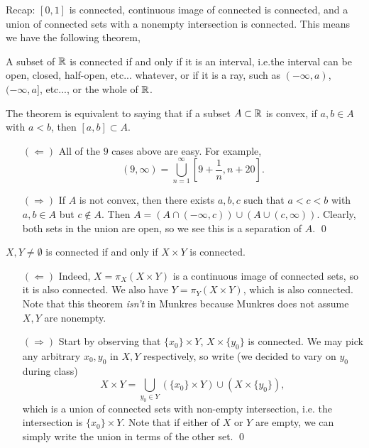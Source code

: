 \noindent Recap: $[0, 1]$ is connected, continuous image of connected is connected, and a union of connected sets with a nonempty intersection is connected. This means we have the following theorem,
\begin{simplethm}
    A subset of $\mathbb R$ is connected if and only if it is an interval, i.e.the interval can be open, closed, half-open, etc... whatever, or if it is a ray, such as $(-\infty, a)$, $(-\infty, a]$, etc..., or the whole of $\mathbb R$.
\end{simplethm}
\noindent The theorem is equivalent to saying that if a subset $A \subset \mathbb R$ is convex, if $a, b \in A$ with $a < b$, then $[a, b] \subset A$.
\begin{itemize}
    \item[$(\Leftarrow)$] All of the $9$ cases above are easy. For example,
    \[ (9, \infty) = \bigcup_{n=1}^\infty \left[9 + \frac{1}{n}, n + 20\right]. \]
    \item[$(\Rightarrow)$] If $A$ is not convex, then there exists $a, b, c$ such that $a < c < b$ with $a, b \in A$ but $c \not\in A$. Then $A = (A \cap (-\infty, c)) \cup (A \cup (c, \infty))$. Clearly, both sets in the union are open, so we see this is a separation of $A$. \qed 
\end{itemize}
\begin{simplethm}
    $X, Y \neq \emptyset$ is connected if and only if $X \times Y$ is connected.
\end{simplethm}
\begin{itemize}
    \item[$(\Leftarrow)$] Indeed, $X = \pi_X (X \times Y)$ is a continuous image of connected sets, so it is also connected. We also have $Y = \pi_Y (X \times Y)$, which is also connected. Note that this theorem \textit{isn't} in Munkres because Munkres does not assume $X, Y$ are nonempty.
    \item[$(\Rightarrow)$] Start by observing that $\{x_0\} \times Y$, $X \times \{y_0\}$ is connected. We may pick any arbitrary $x_0, y_0$ in $X, Y$ respectively, so write (we decided to vary on $y_0$ during class)
    \[ X \times Y = \bigcup_{y_0 \in Y} (\{x_0\} \times Y) \cup (X \times \{y_0\}), \]
    which is a union of connected sets with non-empty intersection, i.e. the intersection is $\{x_0\} \times Y$. Note that if either of $X$ or $Y$ are empty, we can simply write the union in terms of the other set. \qed
\end{itemize}

